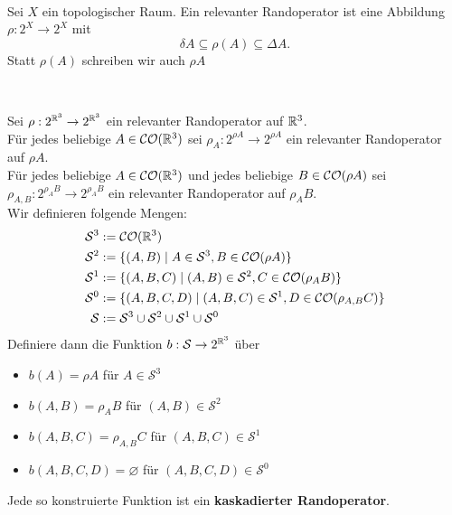         \begin{dfn}\label{dfn:relevanter-rand} \ \vspace{8pt}

        \noindent
        Sei $X$ ein topologischer Raum.
        Ein relevanter Randoperator ist eine Abbildung $\rho: 2^X \to 2^X$ mit
        $$ \delta A \subseteq \rho(A) \subseteq \Delta A. $$
        Statt $\rho(A)$ schreiben wir auch $\rho A$
    \end{dfn}
    
    
    \begin{dfn} \ \vspace{8pt}

        \noindent
        Sei $\rho: 2^{\mathbb{R}^3} \to 2^{\mathbb{R}^3}$ ein relevanter Randoperator auf $\mathbb{R}^3$.\\
        Für jedes beliebige $A \in \mathcal{CO}(\mathbb{R}^3)$ sei $\rho_A : 2^{\rho A} \to 2^{\rho A}$ ein relevanter Randoperator auf $\rho A$.\\
        Für jedes beliebige $A \in \mathcal{CO}(\mathbb{R}^3)$ und jedes beliebige $B \in \mathcal{CO}(\rho A)$ sei $\rho_{A,B} : 2^{\rho_A B} \to 2^{\rho_A B}$ ein relevanter Randoperator auf $\rho_A B$.\\
        Wir definieren folgende Mengen:
        \begin{align*}
            \mathcal{S}^3 &:= \mathcal{CO}(\mathbb{R}^3) \\
            \mathcal{S}^2 &:= \{(A,B) \mid A \in \mathcal{S}^3, B \in \mathcal{CO}(\rho A)\} \\
            \mathcal{S}^1 &:= \{(A,B,C) \mid (A,B) \in \mathcal{S}^2, C \in \mathcal{CO}(\rho_A B)\} \\
            \mathcal{S}^0 &:= \{(A,B,C,D) \mid (A,B,C) \in \mathcal{S}^1, D \in \mathcal{CO}(\rho_{A,B} C)\}\\
            \mathcal{S} &:= \mathcal{S}^3 \cup \mathcal{S}^2 \cup \mathcal{S}^1 \cup \mathcal{S}^0
        \end{align*}
        Definiere dann die Funktion $b : \mathcal{S} \to 2^{\mathbb{R}^3}$ über
        \begin{itemize}
            \item $b(A) = \rho A$ für $A \in \mathcal{S}^3$
            \item $b(A,B) = \rho_A B$ für $(A,B) \in \mathcal{S}^2$
            \item $b(A,B,C) = \rho_{A,B} C$ für $(A,B,C) \in \mathcal{S}^1$
            \item $b(A,B,C,D) = \varnothing$ für $(A,B,C,D) \in \mathcal{S}^0$
        \end{itemize}
        Jede so konstruierte Funktion ist ein \textbf{kaskadierter Randoperator}.
    \end{dfn}
    

